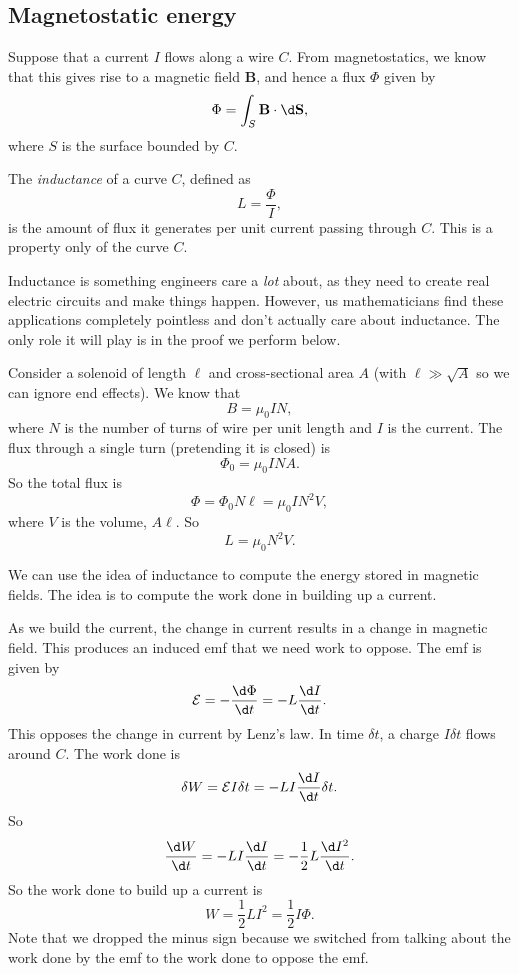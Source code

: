 \documentclass[a4paper]{article}
\begin{document}
\subsection{Magnetostatic energy}
Suppose that a current $I$ flows along a wire $C$. From magnetostatics, we know that this gives rise to a magnetic field $\mathbf{B}$, and hence a flux $\Phi$ given by
\[
  \Phi = \int_S \mathbf{B}\cdot \d \mathbf{S},
\]
where $S$ is the surface bounded by $C$.
\begin{defi}[Inductance]
  The \emph{inductance} of a curve $C$, defined as
  \[
    L = \frac{\Phi}{I},
  \]
  is the amount of flux it generates per unit current passing through $C$. This is a property only of the curve $C$.
\end{defi}

Inductance is something engineers care a \emph{lot} about, as they need to create real electric circuits and make things happen. However, us mathematicians find these applications completely pointless and don't actually care about inductance. The only role it will play is in the proof we perform below.

\begin{eg}
  Consider a solenoid of length $\ell$ and cross-sectional area $A$ (with $\ell \gg \sqrt{A}$ so we can ignore end effects). We know that
  \[
    B = \mu_0 IN,
  \]
  where $N$ is the number of turns of wire per unit length and $I$ is the current. The flux through a single turn (pretending it is closed) is
  \[
    \Phi_0 = \mu_0 INA.
  \]
  So the total flux is
  \[
    \Phi = \Phi_0 N\ell = \mu_0 IN^2V,
  \]
  where $V$ is the volume, $A\ell$. So
  \[
    L = \mu_0 N^2 V.
  \]
\end{eg}

We can use the idea of inductance to compute the energy stored in magnetic fields. The idea is to compute the work done in building up a current.

As we build the current, the change in current results in a change in magnetic field. This produces an induced emf that we need work to oppose. The emf is given by
\[
  \mathcal{E} = -\frac{\d \Phi}{\d t} = -L\frac{\d I}{\d t}.
\]
This opposes the change in current by Lenz's law. In time $\delta t$, a charge $I\delta t$ flows around $C$. The work done is
\[
  \delta W = \mathcal{E} I\delta t = -LI\frac{\d I}{\d t}\delta t.
\]
So
\[
  \frac{\d W}{\d t} = -LI \frac{\d I}{\d t} = -\frac{1}{2}L\frac{\d I^2}{\d t}.
\]
So the work done to build up a current is
\[
  W = \frac{1}{2}LI^2 = \frac{1}{2}I\Phi.
\]
Note that we dropped the minus sign because we switched from talking about the work done by the emf to the work done to oppose the emf.
\end{document}
